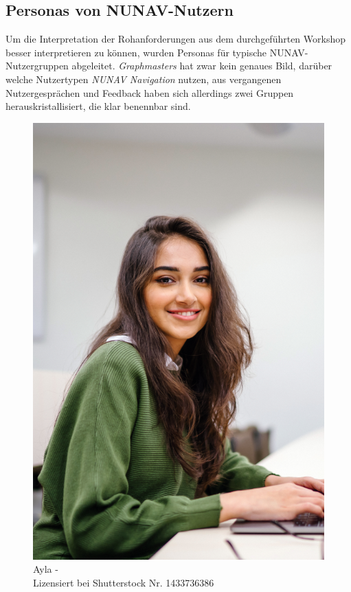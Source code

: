 \subsection{Personas von NUNAV-Nutzern}
\label{sec:06_model_evaluation:personas}

Um die Interpretation der Rohanforderungen aus dem durchgeführten Workshop besser interpretieren zu können, wurden Personas für typische NUNAV-Nutzergruppen abgeleitet. \textit{Graphmasters} hat zwar kein genaues Bild, darüber welche Nutzertypen \textit{NUNAV Navigation} nutzen, aus vergangenen Nutzergesprächen und Feedback haben sich allerdings zwei Gruppen herauskristallisiert, die klar benennbar sind.

\begin{figure}
    \vspace{-\intextsep}
    \centering
    \includegraphics[width=\textwidth]{contents/06_model_evaluation/01_integration/res/persona_picture_ayla.png}
    \caption[]{Ayla -\\Lizensiert bei Shutterstock Nr. 1433736386}
\end{figure}


